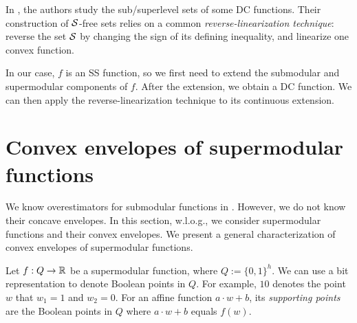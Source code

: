 In \cite{munoz2020maximal,serrano2019,xusignomial}, the authors study  the sub/superlevel sets of some DC functions.
Their construction of $\mathcal S$-free sets relies on a common \textit{reverse-linearization technique}: reverse the set $\mathcal S$ by changing the sign of its defining inequality, and linearize one  convex function.

In  our case, $f$ is an SS function, so we first need to extend the submodular and supermodular components of $f$. After the extension, we obtain a DC function. We can then  apply the reverse-linearization technique to its continuous extension.

\section{Convex envelopes of supermodular functions}
\label{sec.conenvesuper}

We know overestimators for submodular functions in . However, we do not know their concave envelopes. In this section, w.l.o.g., we consider supermodular functions and their convex envelopes.
We present a general characterization of convex envelopes of supermodular functions.


Let $f:Q \to \mathbb R$ be a supermodular function, where $Q:=\{0,1\}^h$. We can use a bit representation to denote Boolean points in $Q$. For example, $10$ denotes the point $w$ that $w_1 = 1$ and $w_2 = 0$. For an affine function $a\cdot w + b$, its \emph{supporting points} are the Boolean points in $Q$ where $a\cdot w + b$ equals $f(w)$.


